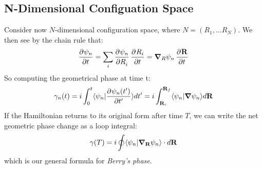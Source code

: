 \subsection{N-Dimensional Configuation Space}
Consider now $N$-dimensional configuration space, where $N = (R_1, \ldots R_N)$. We then see by the chain rule that:
\begin{equation}
    \dpd{\psi_n}{t} = \sum_i \dpd{\psi_n}{R_i}\dpd{R_i}{t} = \nabla_R \psi_n \dpd{\v{R}}{t}
\end{equation}
So computing the geometrical phase at time t:
\begin{equation}
    \gamma_n(t) = i\int_0^t \braket{\psi_n}{\dpd{\psi_n(t')}{t'}}dt' = i\int_{\v{R}_i}^{\v{R}_f} \braket{\psi_n}{\nabla \psi_n}d\v{R}
\end{equation}
If the Hamiltonian returns to its original form after time $T$, we can write the net geometric phase change as a loop integral:
\begin{equation}
    \gamma(T) = i\oint \braket{\psi_n}{\nabla_\v{R}\psi_n} \cdot d\v{R}
\end{equation}
which is our general formula for \emph{Berry's phase}.